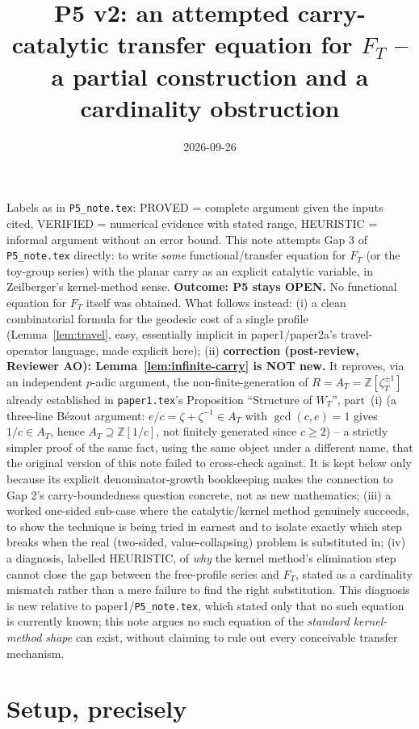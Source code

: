 \documentclass[11pt]{article}
\title{P5 v2: an attempted carry-catalytic transfer equation for $F_T$ --\\
a partial construction and a cardinality obstruction}
\date{2026-09-26}
\theoremstyle{remark}
\newcommand{\Z}{\mathbb Z}
\begin{document}
\maketitle

\noindent Labels as in \texttt{P5\_note.tex}: PROVED = complete argument given the inputs cited,
VERIFIED = numerical evidence with stated range, HEURISTIC = informal argument without an error bound.
This note attempts Gap 3 of \texttt{P5\_note.tex} directly: to write \emph{some} functional/transfer
equation for $F_T$ (or the toy-group series) with the planar carry as an explicit catalytic variable,
in Zeilberger's kernel-method sense. \textbf{Outcome: P5 stays OPEN.} No functional equation for $F_T$
itself was obtained. What follows instead: (i) a clean combinatorial formula for the geodesic cost of a
single profile (Lemma~\ref{lem:travel}, easy, essentially implicit in paper1/paper2a's travel-operator
language, made explicit here); (ii) \textbf{correction (post-review, Reviewer AO): Lemma~\ref{lem:infinite-carry}
is NOT new.} It reproves, via an independent $p$-adic argument, the non-finite-generation of
$R=A_T=\Z[\zeta_T^{\pm1}]$ already established in \texttt{paper1.tex}'s Proposition ``Structure of
$W_T$'', part~(i) (a three-line B\'ezout argument: $e/c=\zeta+\zeta^{-1}\in A_T$ with $\gcd(c,e)=1$
gives $1/c\in A_T$, hence $A_T\supseteq\Z[1/c]$, not finitely generated since $c\ge2$) -- a strictly
simpler proof of the same fact, using the same object under a different name, that the original
version of this note failed to cross-check against. It is kept below only because its explicit
denominator-growth bookkeeping makes the connection to Gap 2's carry-boundedness question concrete,
not as new mathematics; (iii) a worked one-sided sub-case where the catalytic/kernel
method genuinely succeeds, to show the technique is being tried in earnest and to isolate exactly which
step breaks when the real (two-sided, value-collapsing) problem is substituted in; (iv) a diagnosis,
labelled HEURISTIC, of \emph{why} the kernel method's elimination step cannot close the gap between the
free-profile series and $F_T$, stated as a cardinality mismatch rather than a mere failure to find the
right substitution. This diagnosis is new relative to paper1/\texttt{P5\_note.tex}, which stated only that
no such equation is currently known; this note argues no such equation of the \emph{standard kernel-method
shape} can exist, without claiming to rule out every conceivable transfer mechanism.

\section{Setup, precisely}\label{sec:setup}
\end{document}

